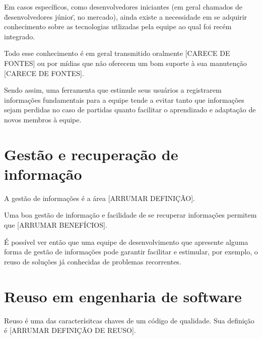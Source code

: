 
Em casos específicos, como desenvolvedores iniciantes (em geral chamados de \"desenvolvedores júnior\", no mercado), ainda existe a necessidade em se adquirir conhecimento sobre as tecnologias utlizadas pela equipe ao qual foi recém integrado.

Todo esse conhecimento é em geral transmitido oralmente [CARECE DE FONTES] ou por mídias que não oferecem um bom suporte à sua manutenção [CARECE DE FONTES].

Sendo assim, uma ferramenta que estimule seus usuários a registrarem informações fundamentais para a equipe tende a evitar tanto que informações sejam perdidas no caso de partidas quanto facilitar o aprendizado e adaptação de novos membros à equipe.

\section{Gestão e recuperação de informação}

A gestão de informações é a área [ARRUMAR DEFINIÇÃO].


Uma boa gestão de informação e facilidade de se recuperar informações permitem que [ARRUMAR BENEFÍCIOS].

É possível ver então que uma equipe de desenvolvimento que apresente alguma forma de gestão de informações pode garantir facilitar e estimular, por exemplo, o reuso de soluções já conhecidas de problemas recorrentes.



\section{Reuso em engenharia de software}

Reuso é uma das caracterísitcas chaves de um código de qualidade. Sua definição é [ARRUMAR DEFINIÇÃO DE REUSO].

